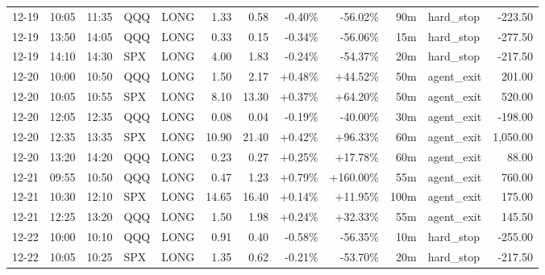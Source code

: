 \documentclass[11pt,a4paper,twoside]{article}
\begin{document}
\begin{center}
\begin{longtable}{>{\color{txtmain}}l l l l l r r r r r >{\color{txtmain}}l r}
12-19 & 10:05 & 11:35 & QQQ & LONG & 1.33 & 0.58 & \textcolor{lossred}{-0.40\%} & \textcolor{lossred}{-56.02\%} & 90m & hard\_stop & \textcolor{lossred}{-223.50} \\
12-19 & 13:50 & 14:05 & QQQ & LONG & 0.33 & 0.15 & \textcolor{lossred}{-0.34\%} & \textcolor{lossred}{-56.06\%} & 15m & hard\_stop & \textcolor{lossred}{-277.50} \\
12-19 & 14:10 & 14:30 & SPX & LONG & 4.00 & 1.83 & \textcolor{lossred}{-0.24\%} & \textcolor{lossred}{-54.37\%} & 20m & hard\_stop & \textcolor{lossred}{-217.50} \\
12-20 & 10:00 & 10:50 & QQQ & LONG & 1.50 & 2.17 & \textcolor{wingreen}{+0.48\%} & \textcolor{wingreen}{+44.52\%} & 50m & agent\_exit & \textcolor{wingreen}{201.00} \\
12-20 & 10:05 & 10:55 & SPX & LONG & 8.10 & 13.30 & \textcolor{wingreen}{+0.37\%} & \textcolor{wingreen}{+64.20\%} & 50m & agent\_exit & \textcolor{wingreen}{520.00} \\
12-20 & 12:05 & 12:35 & QQQ & LONG & 0.08 & 0.04 & \textcolor{lossred}{-0.19\%} & \textcolor{lossred}{-40.00\%} & 30m & agent\_exit & \textcolor{lossred}{-198.00} \\
12-20 & 12:35 & 13:35 & SPX & LONG & 10.90 & 21.40 & \textcolor{wingreen}{+0.42\%} & \textcolor{wingreen}{+96.33\%} & 60m & agent\_exit & \textcolor{wingreen}{1,050.00} \\
12-20 & 13:20 & 14:20 & QQQ & LONG & 0.23 & 0.27 & \textcolor{wingreen}{+0.25\%} & \textcolor{wingreen}{+17.78\%} & 60m & agent\_exit & \textcolor{wingreen}{88.00} \\
12-21 & 09:55 & 10:50 & QQQ & LONG & 0.47 & 1.23 & \textcolor{wingreen}{+0.79\%} & \textcolor{wingreen}{+160.00\%} & 55m & agent\_exit & \textcolor{wingreen}{760.00} \\
12-21 & 10:30 & 12:10 & SPX & LONG & 14.65 & 16.40 & \textcolor{wingreen}{+0.14\%} & \textcolor{wingreen}{+11.95\%} & 100m & agent\_exit & \textcolor{wingreen}{175.00} \\
12-21 & 12:25 & 13:20 & QQQ & LONG & 1.50 & 1.98 & \textcolor{wingreen}{+0.24\%} & \textcolor{wingreen}{+32.33\%} & 55m & agent\_exit & \textcolor{wingreen}{145.50} \\
12-22 & 10:00 & 10:10 & QQQ & LONG & 0.91 & 0.40 & \textcolor{lossred}{-0.58\%} & \textcolor{lossred}{-56.35\%} & 10m & hard\_stop & \textcolor{lossred}{-255.00} \\
12-22 & 10:05 & 10:25 & SPX & LONG & 1.35 & 0.62 & \textcolor{lossred}{-0.21\%} & \textcolor{lossred}{-53.70\%} & 20m & hard\_stop & \textcolor{lossred}{-217.50} \\

\end{longtable}
\end{center}
\end{document}
